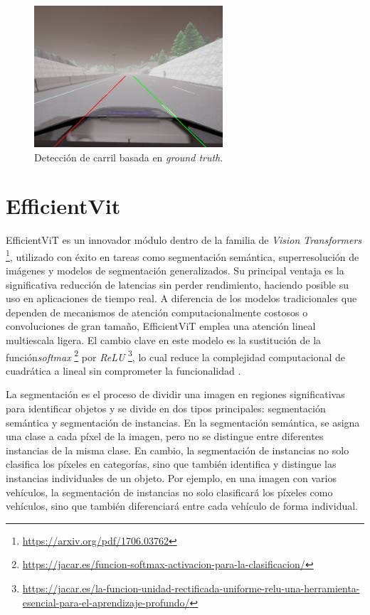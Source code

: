 \begin{figure}[ht]
  \begin{center}
    \includegraphics[width=7cm]{figs/Plataformas_Desarollo/ground_truth.png}
  \end{center}
  \caption{Detección de carril basada en \textit{ground truth}.}
  \label{dl_lane}
\end{figure}

\section{EfficientVit}
\label{sec:ef}

EfficientViT es un innovador módulo dentro de la familia de \textit{Vision Transformers} \footnote{\url{https://arxiv.org/pdf/1706.03762}}, utilizado con éxito en tareas como segmentación semántica, superresolución de imágenes y modelos de segmentación generalizados. Su principal ventaja es la significativa reducción de latencias sin perder rendimiento, haciendo posible su uso en aplicaciones de tiempo real. A diferencia de los modelos tradicionales que dependen de mecanismos de atención computacionalmente costosos o convoluciones de gran tamaño, EfficientViT emplea una atención lineal multiescala ligera. El cambio clave en este modelo es la sustitución de la función\textit{softmax} \footnote{\url{https://jacar.es/funcion-softmax-activacion-para-la-clasificacion/}} por \textit{ReLU} \footnote{\url{https://jacar.es/la-funcion-unidad-rectificada-uniforme-relu-una-herramienta-esencial-para-el-aprendizaje-profundo/}}, lo cual reduce la complejidad computacional de cuadrática a lineal sin comprometer la funcionalidad \cite{efficientvit}.

La segmentación es el proceso de dividir una imagen en regiones significativas para identificar objetos y se divide en dos tipos principales: segmentación semántica y segmentación de instancias. En la segmentación semántica, se asigna una clase a cada píxel de la imagen, pero no se distingue entre diferentes instancias de la misma clase. En cambio, la segmentación de instancias no solo clasifica los píxeles en categorías, sino que también identifica y distingue las instancias individuales de un objeto. Por ejemplo, en una imagen con varios vehículos, la segmentación de instancias no solo clasificará los píxeles como vehículos, sino que también diferenciará entre cada vehículo de forma individual.

